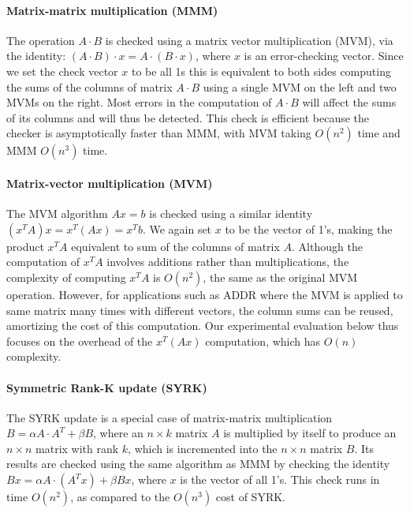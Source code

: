 \documentclass{sig-alternate}
\begin{document}
{\vspace{-5pt}
\paragraph{Matrix-matrix multiplication (MMM)}
The operation $A \cdot B$ is checked using a matrix vector multiplication (MVM), via the identity: $(A \cdot B) \cdot x = A \cdot (B \cdot x)$, where $x$ is an error-checking vector.
Since we set the check vector $x$ to be all 1s this is equivalent to both sides computing the sums of the columns of matrix $A \cdot B$ using a single MVM on the left and two MVMs on the right.
Most errors in the computation of $A \cdot B$ will affect the sums of its columns and will thus be detected.
This check is efficient because the checker is asymptotically faster than MMM, with MVM taking $O(n^2)$ time and MMM $O(n^3)$ time.

\vspace{-5pt}
\paragraph{Matrix-vector multiplication (MVM)}
The MVM algorithm $Ax=b$ is checked using a similar identity $(x^TA)x = x^T(Ax) = x^Tb$.
We again set $x$ to be the vector of 1's, making the product $x^TA$ equivalent to sum of the columns of matrix $A$.
Although the computation of $x^TA$ involves additions rather than multiplications, the complexity of computing $x^TA$ is $O(n^2)$, the same as the original MVM operation.
However, for applications such as ADDR where the MVM is applied to same matrix many times with different vectors, the column sums can be reused, amortizing the cost of this computation.
Our experimental evaluation below thus focuses on the overhead of the $x^T(Ax)$ computation, which has $O(n)$ complexity.

\vspace{-5pt}
\paragraph{Symmetric Rank-K update (SYRK)}
The SYRK update is a special case of matrix-matrix multiplication $B = \alpha A \cdot A^T + \beta B$, where an $n \times k$ matrix $A$ is multiplied by itself to produce an $n \times n$ matrix with rank $k$, which is incremented into the $n \times n$ matrix $B$.
Its results are checked using the same algorithm as MMM by checking the identity $B x = \alpha A \cdot (A^Tx) + \beta B x$, where $x$ is the vector of all 1's.
This check runs in time $O(n^2)$, as compared to the $O(n^3)$ cost of SYRK.

}
\end{document}
